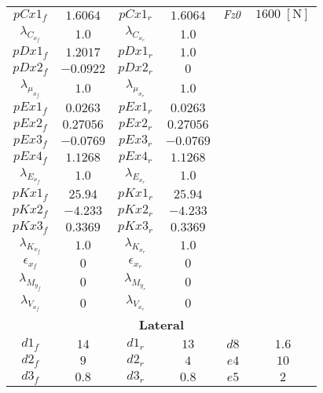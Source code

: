 \begin{longtable}{cccccc}
    \hline \hline
    \endlastfoot
    \multicolumn{6}{c}{\textbf{Longitudinal}}\\ \hline
$pCx1_f       $        &  $1.6064 $  &  $pCx1_r        $        &  $1.6064 $ & $\it Fz0$ & $1600 \; [\si{\newton}]$ \\
$\lambda_{C_{x_f}} $   &  $1.0    $  &  $\lambda_{C_{x_r}}  $   &  $1.0    $ & & \\
$pDx1_f       $        &  $1.2017 $  &  $pDx1_r        $        &  $1.0    $ & & \\
$pDx2_f       $        &  $-0.0922$  &  $pDx2_r        $        &  $0      $ & & \\
$\lambda_{\mu_{x_f}}$  &  $1.0    $  &  $\lambda_{\mu_{x_r}} $  &  $1.0    $ & & \\
$pEx1_f       $        &  $0.0263 $  &  $pEx1_r        $        &  $0.0263 $ & & \\
$pEx2_f       $        &  $0.27056$  &  $pEx2_r        $        &  $0.27056$ & & \\
$pEx3_f       $        &  $-0.0769$  &  $pEx3_r        $        &  $-0.0769$ & & \\
$pEx4_f       $        &  $1.1268 $  &  $pEx4_r        $        &  $1.1268 $ & & \\
$\lambda_{E_{x_f}} $   &  $1.0    $  &  $\lambda_{E_{x_r}}  $   &  $1.0    $ & & \\
$pKx1_f       $        &  $25.94  $  &  $pKx1_r        $        &  $25.94  $ & & \\
$pKx2_f       $        &  $-4.233 $  &  $pKx2_r        $        &  $-4.233 $ & & \\
$pKx3_f       $        &  $0.3369 $  &  $pKx3_r        $        &  $0.3369 $ & & \\
$\lambda_{K_{x_f}} $   &  $1.0    $  &  $\lambda_{K_{x_r}}  $   &  $1.0    $ & & \\
$\epsilon_{x_f}  $     &  $0      $  &  $\epsilon_{x_r}   $     &  $0      $ & & \\
$\lambda_{M_{y_f}} $   &  $0      $  &  $\lambda_{M_{y_r}}  $   &  $0      $ & & \\
$\lambda_{V_{x_f}} $   &  $0      $  &  $\lambda_{V_{x_r}}  $   &  $0      $ & & \\ \hline
\multicolumn{6}{c}{\textbf{Lateral}}\\ \hline
$d1_f$ & $14     $   &  $d1_r$ & $13     $ &  $d8   $ & $1.6 $ \\    
$d2_f$ & $9      $   &  $d2_r$ & $4      $ &  $e4   $ & $10  $ \\    
$d3_f$ & $0.8    $   &  $d3_r$ & $0.8    $ &  $e5   $ & $2   $ \\    

\end{longtable}

